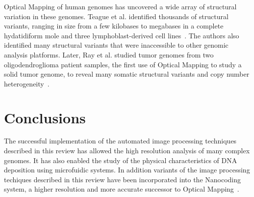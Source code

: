 \documentclass{bmcart}
\begin{document}
Optical Mapping of human genomes has uncovered a wide array of structural 
variation in these genomes. Teague et al. identified thousands of structural 
variants, ranging in size from a few kilobases to megabases in a complete 
hydatidiform mole and three lymphoblast-derived cell 
lines~\cite{Teague2010}. The authors also identified many structural 
variants that were inaccessible to other genomic analysis platforms. Later, 
Ray et al. studied tumor genomes from two oligodendroglioma patient samples, 
the first use of Optical Mapping to study a solid tumor genome, to reveal 
many somatic structural variants and copy number heterogeneity~\cite{Ray2013}.

\section*{Conclusions}
The successful implementation of the automated image processing techniques 
described in this review has allowed the high resolution analysis of many 
complex genomes. It has also enabled the study of the physical characteristics 
of DNA deposition using microfuidic systems. In addition variants of the image processing techiques described in this review have been incorporated into the Nanocoding system, a higher resolution and more accurate successor to 
Optical Mapping~\cite{Jo2007, Pag2013}.  


\end{document}
